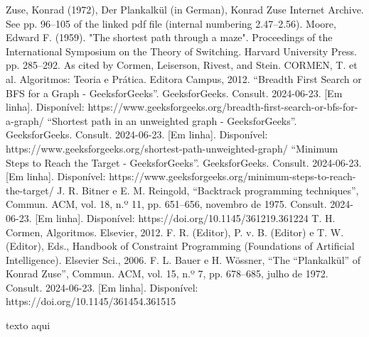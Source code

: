\documentclass[relatorio]{IEEEtran}
\begin{document}
\renewcommand{\refname}{Referências}
\begin{thebibliography}{00}
 Zuse, Konrad (1972), Der Plankalkül (in German), Konrad Zuse Internet Archive. See pp. 96–105 of the linked pdf file (internal numbering 2.47–2.56).
 Moore, Edward F. (1959). "The shortest path through a maze". Proceedings of the International Symposium on the Theory of Switching. Harvard University Press. pp. 285–292. As cited by Cormen, Leiserson, Rivest, and Stein.
 CORMEN, T. et al. Algoritmos: Teoria e Prática. Editora Campus, 2012.
 “Breadth First Search or BFS for a Graph - GeeksforGeeks”. GeeksforGeeks. Consult. 2024-06-23. [Em linha]. Disponível: https://www.geeksforgeeks.org/breadth-first-search-or-bfs-for-a-graph/
 “Shortest path in an unweighted graph - GeeksforGeeks”. GeeksforGeeks. Consult. 2024-06-23. [Em linha]. Disponível: https://www.geeksforgeeks.org/shortest-path-unweighted-graph/
 “Minimum Steps to Reach the Target - GeeksforGeeks”. GeeksforGeeks. Consult. 2024-06-23. [Em linha]. Disponível: https://www.geeksforgeeks.org/minimum-steps-to-reach-the-target/
 J. R. Bitner e E. M. Reingold, “Backtrack programming techniques”, Commun. ACM, vol. 18, n.º 11, pp. 651–656, novembro de 1975. Consult. 2024-06-23. [Em linha]. Disponível: https://doi.org/10.1145/361219.361224
 T. H. Cormen, Algoritmos. Elsevier, 2012.
 F. R. (Editor), P. v. B. (Editor) e T. W. (Editor), Eds., Handbook of Constraint Programming (Foundations of Artificial Intelligence). Elsevier Sci., 2006.
 F. L. Bauer e H. Wössner, “The “Plankalkül” of Konrad Zuse”, Commun. ACM, vol. 15, n.º 7, pp. 678–685, julho de 1972. Consult. 2024-06-23. [Em linha]. Disponível: https://doi.org/10.1145/361454.361515
\end{thebibliography}
\vspace{12pt}
\color{red}
texto aqui
\end{document}
